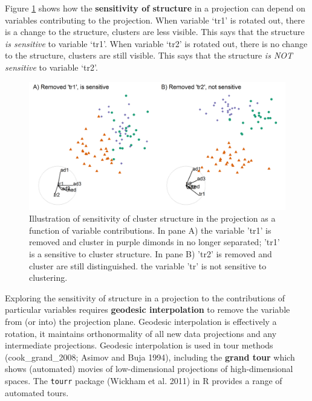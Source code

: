 \documentclass[
  11,
]{article}
\begin{document}
Figure \ref{fig:basisStructure} shows how the \textbf{sensitivity of structure} in a projection can depend on variables contributing to the projection. When variable `tr1' is rotated out, there is a change to the structure, clusters are less visible. This says that the structure \emph{is sensitive} to variable `tr1'. When variable `tr2' is rotated out, there is no change to the structure, clusters are still visible. This says that the structure \emph{is NOT sensitive} to variable `tr2'.

\begin{figure}[h]

{\centering \includegraphics[width=1\linewidth,]{./figures/basisStructure} 

}

\caption{Illustration of sensitivity of cluster structure in the projection as a function of variable contributions. In pane A) the variable 'tr1' is removed and cluster in purple dimonds in no longer separated; 'tr1' is a sensitive to cluster structure. In pane B) 'tr2' is removed and cluster are still distinguished. the variable 'tr' is not sensitive to clustering.}\label{fig:basisStructure}
\end{figure}

Exploring the sensitivity of structure in a projection to the contributions of particular variables requires \textbf{geodesic interpolation} to remove the variable from (or into) the projection plane. Geodesic interpolation is effectively a rotation, it maintains orthonormality of all new data projections and any intermediate projections. Geodesic interpolation is used in tour methods (cook\_grand\_2008; Asimov and Buja 1994), including the \textbf{grand tour} which shows (automated) movies of low-dimensional projections of high-dimensional spaces. The \texttt{tourr} package (Wickham et al. 2011) in R provides a range of automated tours.
\end{document}
